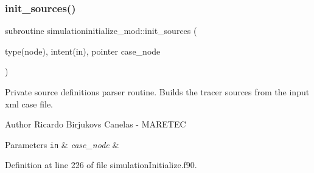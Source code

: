 \subsubsection{\texorpdfstring{init\+\_\+sources()}{init\_sources()}}
{\footnotesize\ttfamily subroutine simulationinitialize\+\_\+mod\+::init\+\_\+sources (\begin{DoxyParamCaption}\item[{type(node), intent(in), pointer}]{case\+\_\+node }\end{DoxyParamCaption})\hspace{0.3cm}{\ttfamily [private]}}



Private source definitions parser routine. Builds the tracer sources from the input xml case file. 

\begin{DoxyAuthor}{Author}
Ricardo Birjukovs Canelas -\/ M\+A\+R\+E\+T\+EC 
\end{DoxyAuthor}

\begin{DoxyParams}[1]{Parameters}
\mbox{\tt in}  & {\em case\+\_\+node} & \\
\hline
\end{DoxyParams}


Definition at line 226 of file simulation\+Initialize.\+f90.


